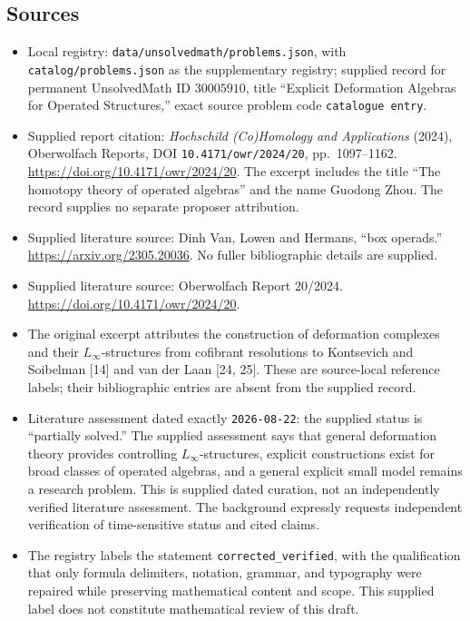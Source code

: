 \documentclass[11pt]{article}
\begin{document}
\subsection{Sources}
\begin{itemize}
\item Local registry: \texttt{data/unsolvedmath/problems.json}, with \texttt{catalog/problems.json} as the supplementary registry; supplied record for permanent UnsolvedMath ID \(30005910\), title ``Explicit Deformation Algebras for Operated Structures,'' exact source problem code \texttt{catalogue entry}.
\item Supplied report citation: \emph{Hochschild (Co)Homology and Applications} (2024), Oberwolfach Reports, DOI \texttt{10.4171/owr/2024/20}, pp.\ 1097--1162. \url{https://doi.org/10.4171/owr/2024/20}. The excerpt includes the title ``The homotopy theory of operated algebras'' and the name Guodong Zhou. The record supplies no separate proposer attribution.
\item Supplied literature source: Dinh Van, Lowen and Hermans, ``box operads.'' \url{https://arxiv.org/2305.20036}. No fuller bibliographic details are supplied.
\item Supplied literature source: Oberwolfach Report 20/2024. \url{https://doi.org/10.4171/owr/2024/20}.
\item The original excerpt attributes the construction of deformation complexes and their \(L_\infty\)-structures from cofibrant resolutions to Kontsevich and Soibelman [14] and van der Laan [24, 25]. These are source-local reference labels; their bibliographic entries are absent from the supplied record.
\item Literature assessment dated exactly \texttt{2026-08-22}: the supplied status is ``partially solved.'' The supplied assessment says that general deformation theory provides controlling \(L_\infty\)-structures, explicit constructions exist for broad classes of operated algebras, and a general explicit small model remains a research problem. This is supplied dated curation, not an independently verified literature assessment. The background expressly requests independent verification of time-sensitive status and cited claims.
\item The registry labels the statement \texttt{corrected\_verified}, with the qualification that only formula delimiters, notation, grammar, and typography were repaired while preserving mathematical content and scope. This supplied label does not constitute mathematical review of this draft.
\end{itemize}
\end{document}
